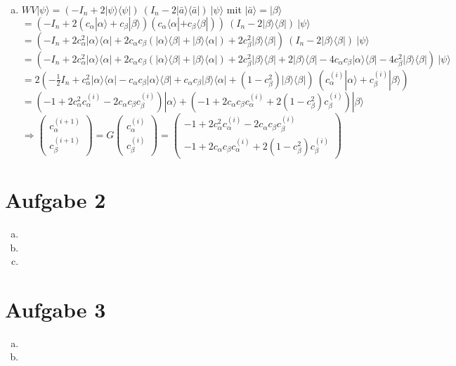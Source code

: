 \documentclass[a4paper]{scrartcl}
\begin{document}
\begin{enumerate}[a)]
\item $WV | \psi \rangle = (-I_n +2 |\psi \rangle \langle \psi | ) ~ (I_n - 2 |\bar{a} \rangle \langle \bar{a}| ) ~ | \psi \rangle$ mit $|\bar{a} \rangle = |\beta \rangle$\\
$= (-I_n +2 (c_{\alpha} |\alpha \rangle + c_{\beta} |\beta \rangle) (c_{\alpha} \langle \alpha| + c_{\beta} \langle \beta|) ) ~ (I_n - 2 | \beta \rangle \langle \beta| ) ~ | \psi \rangle$\\
$= (-I_n +2 c_{\alpha}^2 |\alpha \rangle \langle \alpha| + 2 c_{\alpha} c_{\beta} ( |\alpha \rangle \langle \beta| + |\beta \rangle \langle \alpha|) + 2 c_{\beta}^2 |\beta \rangle \langle \beta| ) ~ (I_n - 2 | \beta \rangle \langle \beta| ) ~ | \psi \rangle$\\
$= (-I_n +2 c_{\alpha}^2 |\alpha \rangle \langle \alpha| + 2c_{\alpha}c_{\beta} ( |\alpha \rangle \langle \beta| + |\beta \rangle \langle \alpha|) + 2c_{\beta}^2 |\beta \rangle \langle \beta| + 2 | \beta \rangle \langle \beta| - 4 c_{\alpha}c_{\beta} |\alpha \rangle \langle \beta| - 4 c_{\beta}^2 |\beta \rangle \langle \beta| ) ~ | \psi \rangle$\\
$= 2(- \frac{1}{2}I_n + c_{\alpha}^2 |\alpha \rangle \langle \alpha| - c_{\alpha}c_{\beta} |\alpha \rangle \langle \beta| + c_{\alpha}c_{\beta} |\beta \rangle \langle \alpha| + (1 - c_{\beta}^2) |\beta \rangle \langle \beta|) ~ (c_{\alpha}^{(i)} |\alpha \rangle + c_{\beta}^{(i)} |\beta \rangle)$\\
$= (- 1 + 2c_{\alpha}^2 c_{\alpha}^{(i)} - 2c_{\alpha}c_{\beta} c_{\beta}^{(i)}) |\alpha \rangle + (-1 + 2c_{\alpha}c_{\beta} c_{\alpha}^{(i)} + 2(1 - c_{\beta}^2) c_{\beta}^{(i)} ) |\beta \rangle$\\

$\Rightarrow  \begin{pmatrix} c_{\alpha}^{(i+1)}\\ c_{\beta}^{(i+1)}\end{pmatrix} = G \begin{pmatrix} c_{\alpha}^{(i)}\\ c_{\beta}^{(i)}\end{pmatrix} = \begin{pmatrix}- 1 + 2c_{\alpha}^2 c_{\alpha}^{(i)} - 2c_{\alpha}c_{\beta} c_{\beta}^{(i)} \\ -1 + 2c_{\alpha}c_{\beta} c_{\alpha}^{(i)} + 2(1 - c_{\beta}^2) c_{\beta}^{(i)} \end{pmatrix}$

\end{enumerate}


\newpage
\section*{Aufgabe 2}
\begin{enumerate}[a)]
\item
\item
\item

\end{enumerate}

\newpage
\section*{Aufgabe 3}
\begin{enumerate}[a)]
\item
\item

\end{enumerate}
\end{document}
